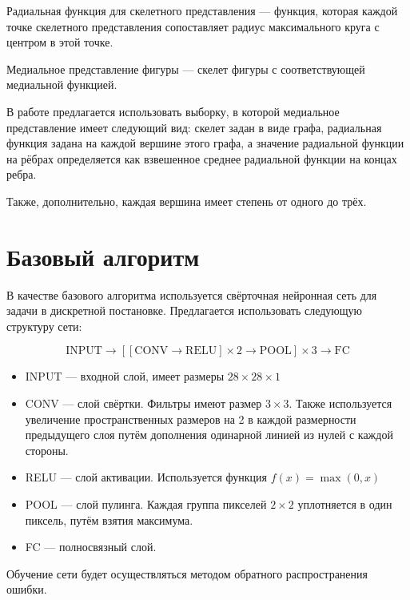 \documentclass[12pt,twoside]{article}
\begin{document}
	\begin{Def}
		Радиальная функция для скелетного представления --- функция, которая каждой точке скелетного представления сопоставляет радиус максимального круга с центром в этой точке.
	\end{Def}
	
	\begin{Def}
		Медиальное представление фигуры --- скелет фигуры с соответствующей медиальной функцией.
	\end{Def}
	
	В работе предлагается использовать выборку, в которой медиальное представление имеет следующий вид: скелет задан в виде графа, радиальная функция задана на каждой вершине этого графа, а значение радиальной функции на рёбрах определяется как взвешенное среднее радиальной функции на концах ребра. 
	
	Также, дополнительно, каждая вершина имеет степень от одного до трёх.
	
	\section{Базовый алгоритм}
	
	В качестве базового алгоритма используется свёрточная нейронная сеть для задачи в дискретной постановке. Предлагается использовать следующую структуру сети:
	
	$$\text{INPUT} \rightarrow [[\text{CONV} \rightarrow \text{RELU}]\times2 \rightarrow \text{POOL}]\times3 \rightarrow \text{FC}$$
	
	\begin{itemize}
		\item INPUT --- входной слой, имеет размеры $28\times28\times1$
		\item CONV --- слой свёртки. Фильтры имеют размер $3\times3$. Также используется увеличение пространственных размеров на 2 в каждой размерности предыдущего слоя путём дополнения одинарной линией из нулей с каждой стороны.
		\item RELU --- слой активации. Используется функция $f(x)=\max(0,x)$
		\item POOL --- слой пулинга. Каждая группа пикселей $2\times2$ уплотняется в один пиксель, путём взятия максимума.
		\item FC --- полносвязный слой. 
	\end{itemize}
	
	Обучение сети будет осуществляться методом обратного распространения ошибки.
	
	\nocite{*}
	
	
	
\end{document}

